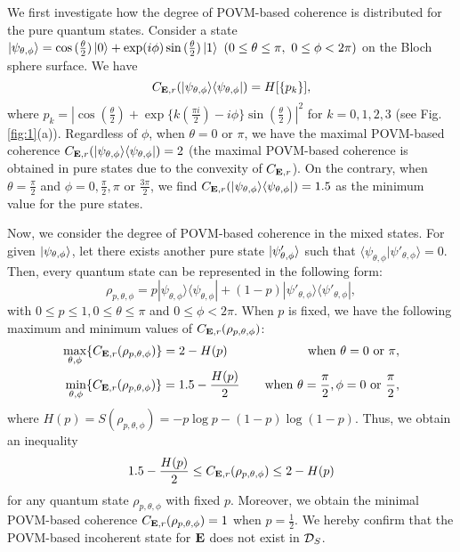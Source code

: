 \documentclass[american,aps,pra,reprint, superscriptaddress]{revtex4-1}
\def\be{\begin{equation}}
\def\ee{\end{equation}}
\def\bea{\begin{eqnarray*}}
\def\eea{\end{eqnarray*}}
\theoremstyle{plain}
\newcommand{\iinner}[2]{\langle #1 | #2\rangle}
\newcommand{\out}[2]{| #1\rangle\langle #2 |}
\theoremstyle{definition}
\theoremstyle{remark}
\begin{document}
We first investigate how the degree of POVM-based coherence is distributed for the pure quantum states.
Consider a state $\ket{\psi_{\theta,\phi}} = \cos{(\frac{\theta}{2})}\ket{0}+\exp(i\phi)\sin{(\frac{\theta}{2})}\ket{1}\ (0\leq\theta\leq \pi,\ 0\leq \phi <2\pi)$ on the Bloch sphere surface. We have
\be
C_{\bE,r}(\out{\psi_{\theta,\phi}}{\psi_{\theta,\phi}}) = H[\{p_k\}],
\ee
where $p_k = |\cos{(\frac{\theta}{2})} + \exp\{k(\frac{\pi i}{2})-i\phi\}\sin{(\frac{\theta}{2})}|^{2}$ for $k=0,1,2,3$ \big(see Fig. \ref{fig:1}(a)\big).
Regardless of $\phi$, when $\theta = 0$ or $\pi$, we have the maximal POVM-based coherence $C_{\bE,r}(\out{\psi_{\theta,\phi}}{\psi_{\theta,\phi}})= 2$ (the maximal POVM-based coherence is obtained in pure states due to the convexity of $C_{\mathbf{E},r}$).
On the contrary, when $\theta = \frac{\pi}{2}$ and $\phi= 0,\frac{\pi}{2},\pi$ or $\frac{3\pi}{2}$, we find $C_{\bE,r}(\out{\psi_{\theta,\phi}}{\psi_{\theta,\phi}})= 1.5$ as the minimum value for the pure states.

Now, we consider the degree of POVM-based coherence in the mixed states. For given $\ket{\psi_{\theta,\phi}}$, let there exists another pure state $\ket{\psi'_{\theta,\phi}}$ such that $\iinner{\psi_{\theta,\phi}}{\psi'_{\theta,\phi}}=0$. Then, every quantum state can be represented in the following form:
\be
\rho_{p,\theta,\phi} = p\out{\psi_{\theta,\phi}}{\psi_{\theta,\phi}} + (1-p)\out{\psi'_{\theta,\phi}}{\psi'_{\theta,\phi}},
\ee
with $0\leq p\leq 1, 0\leq \theta \leq \pi$ and $0\leq \phi < 2\pi$.
When $p$ is fixed, we have the following maximum and minimum values of $C_{\mathbf{E},r}(\rho_{p,\theta,\phi})$:
\bea
\max_{\theta,\phi}\{C_{\bE,r}(\rho_{p,\theta,\phi})\} = 2-H(p)\quad \ \ \  &&\textmd{when}\ \theta=0\ \textmd{or}\ \pi,\\
\min_{\theta,\phi}\{C_{\bE,r}(\rho_{p,\theta,\phi})\} = 1.5-\frac{H(p)}{2}\quad &&\textmd{when}\ \theta=\frac{\pi}{2}, \phi =0\ \textmd{or}\ \frac{\pi}{2},
\eea
where $H(p) = S(\rho_{p,\theta,\phi}) = -p\log p -(1-p)\log (1-p)$. Thus, we obtain an inequality
\be\label{eq:13}
1.5-\frac{H(p)}{2}\leq C_{\bE,r}(\rho_{p,\theta,\phi})\leq 2-H(p)
\ee
for any quantum state $\rho_{p,\theta,\phi}$ with fixed $p$. Moreover, we obtain the minimal POVM-based coherence $C_{\mathbf{E},r}(\rho_{p,\theta,\phi}) = 1$ when $p=\frac{1}{2}$.
We hereby confirm that the POVM-based incoherent state for $\mathbf{E}$ does not exist in $\mathcal{D}_S$.
\end{document}
